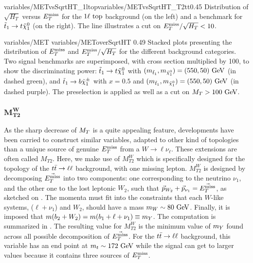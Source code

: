                      {variables/METvsSqrtHT_1ltop}{variables/METvsSqrtHT_T2tt}{0.45}
                     {Distribution of $\sqrt{H_T}$ versus $E_T^\text{miss}$ for the
                     $1\ell~\text{top}$ background (on the left) and a benchmark for
                     $\tilde{t}_1 \rightarrow t \tilde{\chi}_1^0$ (on the right).
                     The line illustrates a cut on $E_T^\text{miss} / \sqrt{H_T} < 10$.}

                     {variables/MET}
                     {variables/METoverSqrtHT}
                     {0.49}
                     {Stacked plots presenting the distribution of $E_T^\text{miss}$ and $E_T^\text{miss} /
                     \sqrt{H_T}$ for the different background categories. Two
                     signal benchmarks are superimposed, with cross section multiplied
                     by 100, to show the discriminating power:
                     $\tilde{t}_1 \rightarrow t \tilde{\chi}_1^0$ with $(m_{\tilde{t}_1},m_{\tilde{\chi}_1^0})
                     = (550,50)~\text{GeV}$ (in dashed green), and $\tilde{t}_1 \rightarrow b \tilde{\chi}_1^\pm$
                     with $x = 0.5$ and $(m_{\tilde{t}_1}, m_{\tilde{\chi}_1^0}) = (550,50)~\text{GeV}$
                     (in dashed purple). The preselection is applied as well as a cut
                     on $M_T > 100 ~\text{GeV}$.}

    \subsubsection{$\mathbf{M_{T2}^{W}}$}

    As the sharp decrease of $M_T$ is a quite appealing feature, developments have been
    carried \cite{MT2variables} to construct similar variables, adapted to other kind
    of topologies than
    a unique source of genuine $E_T^\text{miss}$ from a $W \rightarrow \ell \nu_\ell$.  These extensions are
    often called $M_{T2}$. Here, we make use of $M_{T2}^W$ which is specifically
    designed for the topology of the $t\bar{t} \rightarrow \ell \ell$ background, with
    one missing lepton. $M_{T2}^W$ is designed by decomposing $\vec{E_T^\text{miss}}$ into two
    components: one corresponding to the neutrino $\nu_1$, and the other one to
    the lost leptonic $W_2$, such that $\vec{p}_{W_2} + \vec{p}_{\nu_1} = \vec{E_T^\text{miss}}$,
    as sketched on .
    The momenta must fit into the constraints that each $W$-like systems, ($\ell + \nu_1$)
    and $W_2$, should have a mass $m_W \sim 80 ~\text{GeV}$. Finally, it is imposed that
    $m(b_2 + W_2) = m(b_1 + \ell + \nu_1) \equiv m_{Y}$. The computation is
    summarized in .
    The resulting value for $M_{T2}^W$ is the minimum value of $m_{Y}$ found across
    all possible decomposition of $\vec{E_T^\text{miss}}$. For the $t\bar{t} \rightarrow \ell \ell$ background,
    this variable has an end point at $m_t \sim 172~\text{GeV}$ while the signal can get to
    larger values because it contains three sources of $E_T^\text{miss}$.

